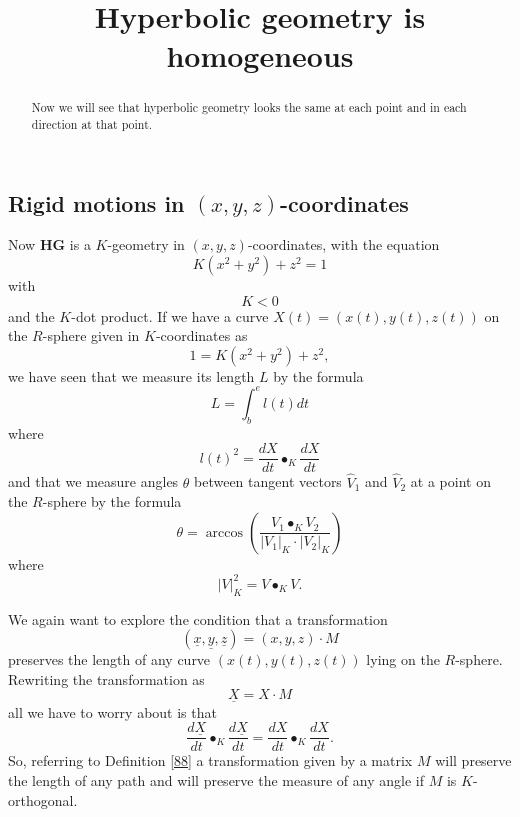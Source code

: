 \documentclass{ximera}
\title{Hyperbolic geometry is homogeneous}
\begin{document}
\begin{abstract}
Now we will see that hyperbolic geometry looks the same at each point
and in each direction at that point.
\end{abstract}
\maketitle


\subsection*{Rigid motions in $\left(  x,y,z\right)  $-coordinates}

Now \textbf{HG} is a $K$-geometry in $\left( x,y,z\right) $-coordinates, with the equation
\begin{equation}
K\left(  x^{2}+y^{2}\right)  +z^{2}=1 \label{83}%
\end{equation}
with%
\[
K<0
\]
and the $K$-dot product. If we have a curve $X\left( t\right) =\left(
x\left( t\right) ,y\left( t\right) ,z\left( t\right) \right) $ on the
$R$-sphere given in $K$-coordinates as%
\[
1=K\left(  x^{2}+y^{2}\right)  +z^{2},
\]
we have seen that we measure its length $L$ by the formula%
\begin{equation}
L=%
{\displaystyle\int\nolimits_{b}^{e}}
l\left(  t\right)  dt \label{84}%
\end{equation}
where
\begin{equation}
l\left(  t\right)  ^{2}=\frac{dX}{dt}\bullet_{K}\frac{dX}{dt} \label{85}%
\end{equation}
and that we measure angles $\theta$ between tangent vectors
$\hat{V}_{1}$ and $\hat{V}_{2}$ at a point on the $R$-sphere by the
formula%
\[
\theta=\arccos \left(  \frac{V_{1}\bullet_{K}V_{2}}{\left\vert
V_{1}\right\vert _{K}\cdot\left\vert V_{2}\right\vert
_{K}}\right)
\]
where%
\[
\left\vert V\right\vert _{K}^{2}=V\bullet_{K}V.
\]


We again want to explore the condition that a transformation%
\[
\left(  \underline{x},\underline{y},\underline{z}\right)  =\left(
x,y,z\right)  \cdot M
\]
preserves the length of any curve $\left( x\left( t\right) ,y\left(
t\right) ,z\left( t\right) \right) $ lying on the
$R$-sphere. Rewriting the transformation as%
\[
\underline{X}=X\cdot M
\]
all we have to worry about is that%
\[
\frac{d\underline{X}}{dt}\bullet_{K}\frac{d\underline{X}}{dt}=\frac{dX}%
{dt}\bullet_{K}\frac{dX}{dt}.
\]
So, referring to Definition \ref{88} a transformation given by a
matrix $M$ will preserve the length of any path and will preserve the
measure of any angle if $M$ is $K$-orthogonal.
\end{document}
